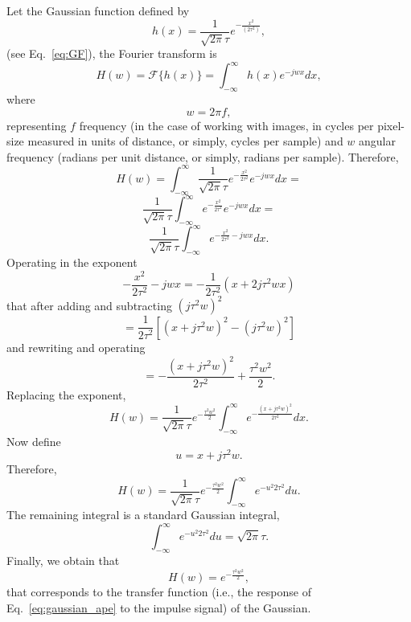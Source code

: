\documentclass{article}
\begin{document}
Let the Gaussian function defined by
\begin{equation}
  h(x) = \frac{1}{\sqrt{2\pi}\tau}e^{-\frac{{x}^2}{(2\tau^2)}},
  \label{eq:gaussian_ape}
\end{equation}
(see Eq.~\ref{eq:GF}), the Fourier transform  is
\begin{equation}
  H(w) = \mathcal{F}\{h(x)\} = \int_{-\infty}^{\infty}h(x)e^{-jwx}dx,
\end{equation}
where
\begin{equation}
  w = 2\pi f,
\end{equation}
representing $f$ frequency (in the case of working with images, in
cycles per pixel-size measured in units of distance, or simply, cycles
per sample) and $w$ angular frequency (radians per unit distance, or
simply, radians per sample). Therefore,
\begin{equation*}
  H(w) = \int_{-\infty}^{\infty}\frac{1}{\sqrt{2\pi}\tau}e^{-\frac{x^2}{2\tau^2}}e^{-jwx}dx = 
\end{equation*}
\begin{equation*}
  \frac{1}{\sqrt{2\pi}\tau}\int_{-\infty}^{\infty}e^{-\frac{x^2}{2\tau^2}}e^{-jwx}dx = 
\end{equation*}
\begin{equation*}
  \frac{1}{\sqrt{2\pi}\tau}\int_{-\infty}^{\infty}e^{-\frac{x^2}{2\tau^2}-jwx}dx.
\end{equation*}
Operating in the exponent
\begin{equation*}
  -\frac{x^2}{2\tau^2}-jwx = -\frac{1}{2\tau^2}(x+2j\tau^2wx)
\end{equation*}
that after adding and subtracting $(j\tau^2w)^2$
\begin{equation*}
  = \frac{1}{2\tau^2}[(x+j\tau^2w)^2-(j\tau^2w)^2]
\end{equation*}
and rewriting and operating
\begin{equation*}
  = -\frac{(x+j\tau^2w)^2}{2\tau^2} + \frac{\tau^2w^2}{2}.
\end{equation*}
Replacing the exponent,
\begin{equation*}
  H(w) = \frac{1}{\sqrt{2\pi}\tau}e^{-\frac{\tau^2w^2}{2}}\int_{-\infty}^{\infty}e^{-\frac{(x+j\tau^2w)^2}{2\tau^2}}dx.
\end{equation*}
Now define
\begin{equation*}
  u = x + j\tau^2w.
\end{equation*}
Therefore,
\begin{equation*}
  H(w) = \frac{1}{\sqrt{2\pi}\tau}e^{-\frac{\tau^2w^2}{2}}\int_{-\infty}^{\infty}e^{{-u^2}{2\tau^2}}du.
\end{equation*}
The remaining integral is a standard Gaussian integral,
\begin{equation*}
  \int_{-\infty}^{\infty}e^{{-u^2}{2\tau^2}}du = \sqrt{2\pi}\tau.
\end{equation*}
Finally, we obtain that
\begin{equation}
  H(w) = e^{-\frac{\tau^2w^2}{2}},
  \label{eq:FTGF}
\end{equation}
that corresponds to the transfer function (i.e., the response of
Eq.~\ref{eq:gaussian_ape} to the impulse signal) of the Gaussian.
\end{document}
